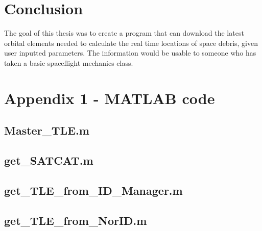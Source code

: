 \documentclass[12pt]{article}
\begin{document}
	
	\section{Conclusion}
	The goal of this thesis was to create a program that can download the latest orbital elements needed to calculate the real time locations of space debris, given user inputted parameters. The information would be usable to someone who has taken a basic spaceflight mechanics class. 
	

	
		
		
		
		

		
		\newpage
		\singlespacing
		\section*{Appendix 1 - MATLAB code}
		
		
	\subsection{Master\_TLE.m}
	
	\subsection{get\_SATCAT.m}
		
		\subsection{get\_TLE\_from\_ID\_Manager.m}
	
	
	\subsection{get\_TLE\_from\_NorID.m}
	
	
		
	
\end{document}
